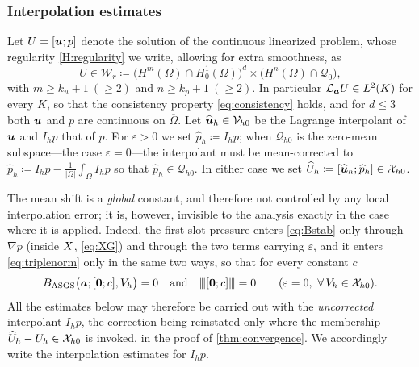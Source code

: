 \subsubsection{Interpolation estimates}
Let $U=[\boldsymbol{u};p]$ denote the solution of the continuous linearized problem, whose regularity
\cref{H:regularity} we write, allowing for extra smoothness, as
\begin{equation}\label{eq:regularity}
  U\in\mathcal{W}_r \coloneqq
  \bigl(H^{m}(\Omega)\cap H^1_0(\Omega)\bigr)^d
  \times\bigl(H^{n}(\Omega)\cap\mathcal{Q}_0\bigr),
\end{equation}
with $m\ge k_u+1\ (\ge 2)$ and $n\ge k_p+1\ (\ge 2)$.
In particular
$\mathcal{L}_{\boldsymbol{a}}U\in L^2(K)$ for every $K$, so that the consistency property
\eqref{eq:consistency} holds, and for $d\le3$ both $\boldsymbol{u}$ and $p$ are continuous on
$\overline{\Omega}$. Let $\widehat{\boldsymbol{u}}_h\in\mathcal{V}_{h0}$ be the Lagrange interpolant of $\boldsymbol{u}$ and
$I_h p$ that of $p$. For $\varepsilon>0$ we set $\widehat{p}_h\coloneqq I_h p$; when
$\mathcal{Q}_{h0}$ is the zero{\hyp}mean subspace---the case $\varepsilon=0$---the interpolant
must be mean{\hyp}corrected to
$\widehat{p}_h\coloneqq I_h p-\tfrac{1}{|\Omega|}\int_\Omega I_h p$ so that
$\widehat{p}_h\in\mathcal{Q}_{h0}$. In either case we set
$\widehat{U}_h\coloneqq[\widehat{\boldsymbol{u}}_h;\widehat{p}_h]\in\mathcal{X}_{h0}$.

The mean shift is a \emph{global} constant, and therefore not controlled by any local
interpolation error; it is, however, invisible to the analysis exactly in the case where it is
applied. Indeed, the first{\hyp}slot pressure enters \eqref{eq:Bstab} only through $\nabla p$
(inside $X$, \cref{eq:XG}) and through the two terms carrying $\varepsilon$, and it enters
\eqref{eq:triplenorm} only in the same two ways, so that for every constant $c$
\begin{equation}\label{eq:constshift}
  B_{\mathrm{ASGS}} \bigl(\boldsymbol{a};[\boldsymbol{0};c],V_h\bigr)=0
  \quad\text{and}\quad
  {\lvert\kern-0.25ex\lvert\kern-0.25ex\lvert [\boldsymbol{0};c] \rvert\kern-0.25ex\rvert\kern-0.25ex\rvert}=0
  \qquad (\varepsilon=0,\ \forall\, V_h\in\mathcal{X}_{h0}).
\end{equation}
All the estimates below may therefore be carried out with the \emph{uncorrected} interpolant
$I_h p$, the correction being reinstated only where the membership
$\widehat{U}_h-U_h\in\mathcal{X}_{h0}$ is invoked, in the proof of \cref{thm:convergence}. We accordingly
write the interpolation estimates for $I_h p$.

